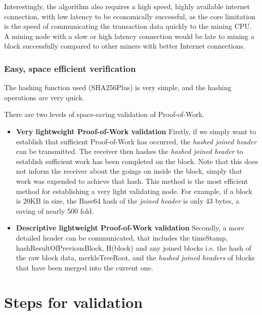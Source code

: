 \documentclass[a4paper,12pt]{article}
\begin{document}
Interestingly, the algorithm also requires a high speed, highly available internet connection, with low latency to be economically successful, as the core limitation is the speed of communicating the transaction data quickly to the mining CPU. A mining node with a slow or high latency connection would be late to mining a block successfully compared to other miners with better Internet connections.

\subsubsection{Easy, space efficient verification}
The hashing function used (SHA256Plus) is very simple, and the hashing operations are very quick.

There are two levels of space-saving validation of Proof-of-Work.
\begin{itemize}
  \item \textbf{Very lightweight Proof-of-Work validation} Firstly, if we simply want to establish that sufficient Proof-of-Work has occurred, the \textit{hashed joined header} can be transmitted. The receiver then hashes the \textit{hashed joined header} to establish sufficient work has been completed on the block. Note that this does not inform the receiver about the goings on inside the block, simply that work was expended to achieve that hash. This method is the most efficient method for establishing a very light validating node. For example, if a block is 20KB in size, the Base64 hash of the \textit{joined header} is only 43 bytes, a saving of nearly 500 fold.

  \item \textbf{Descriptive lightweight Proof-of-Work validation}
  Secondly, a more detailed header can be communicated, that includes the timeStamp, hashResultOfPreviousBlock, H(block) and any joined blocks i.e. the hash of the raw block data, merkleTreeRoot, and the \textit{hashed joined headers} of blocks that have been merged into the current one. 
\end{itemize}






\section{Steps for validation}
\end{document}
